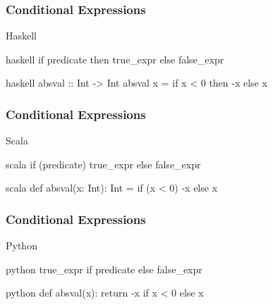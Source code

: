 \documentclass[dvipsnames]{beamer}
\theoremstyle{plain}
\begin{document}
\begin{frame}[fragile]
  \frametitle{Conditional Expressions}

  \begin{block}{Haskell}
    \begin{pygments}{haskell}
if predicate then true_expr else false_expr
    \end{pygments}
  \end{block}

  \pause
  \medskip
  \begin{example}[Haskell]
    \begin{pygments}{haskell}
absval :: Int -> Int
absval x = if x < 0 then -x else x
    \end{pygments}
  \end{example}
\end{frame}

\begin{frame}[fragile]
  \frametitle{Conditional Expressions}

  \begin{block}{Scala}
    \begin{pygments}{scala}
if (predicate) true_expr else false_expr
    \end{pygments}
  \end{block}

  \pause
  \medskip
  \begin{example}[Scala]
    \begin{pygments}{scala}
def absval(x: Int): Int =
    if (x < 0) -x else x
    \end{pygments}
  \end{example}
\end{frame}

\begin{frame}[fragile]
  \frametitle{Conditional Expressions}

  \begin{block}{Python}
    \begin{pygments}{python}
true_expr if predicate else false_expr
    \end{pygments}
  \end{block}

  \pause
  \medskip
  \begin{example}[Python]
    \begin{pygments}{python}
def absval(x):
    return -x if x < 0 else x
    \end{pygments}
  \end{example}
\end{frame}
\end{document}
